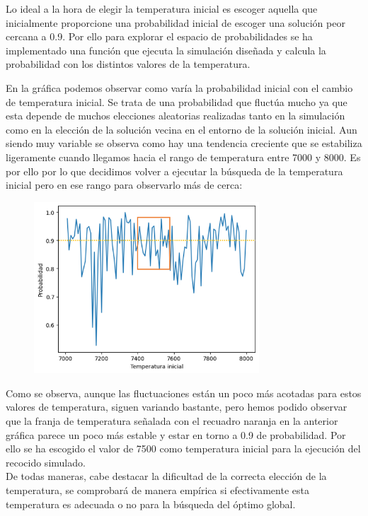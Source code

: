 \documentclass[a4paper,12pt]{article}
\begin{document}
	Lo ideal a la hora de elegir la temperatura inicial es escoger aquella que inicialmente proporcione una probabilidad inicial de escoger una solución peor cercana a 0.9. Por ello para explorar el espacio de probabilidades se ha implementado una función que ejecuta la simulación diseñada y calcula la probabilidad con los distintos valores de la temperatura. 

	En la gráfica podemos observar como varía la probabilidad inicial con el cambio de temperatura inicial. Se trata de una probabilidad que fluctúa mucho ya que esta depende de muchos elecciones aleatorias realizadas tanto en la simulación como en la elección de la solución vecina en el entorno de la solución inicial. Aun siendo muy variable se observa como hay una tendencia creciente que se estabiliza ligeramente cuando llegamos hacia el rango de temperatura entre 7000 y 8000. Es por ello por lo que decidimos volver a ejecutar la búsqueda de la temperatura inicial pero en ese rango para observarlo más de cerca:
	
	\begin{figure}[H]
		\centering
		\includegraphics[width=0.75\textwidth]{include/Temperaturas/grafico2.png}
	
	\end{figure}
	Como se observa, aunque las fluctuaciones están un poco más acotadas para estos valores de temperatura, siguen variando bastante, pero hemos podido observar que la franja de temperatura señalada con el recuadro naranja en la anterior gráfica parece un poco más estable y estar en torno a 0.9 de probabilidad.  Por ello se ha escogido el valor de 7500 como temperatura inicial para la ejecución del recocido simulado.\\

	De todas maneras, cabe destacar la dificultad de la correcta elección de la temperatura, se comprobará de manera empírica si efectivamente esta temperatura es adecuada o no para la búsqueda del óptimo global.
\end{document}
